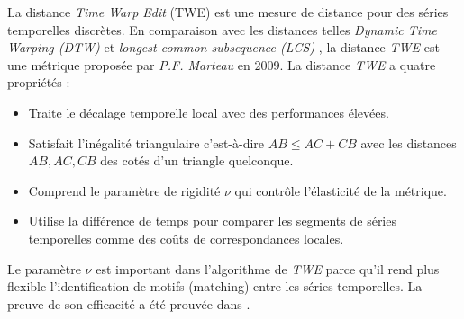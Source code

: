 La distance {\em Time Warp Edit} (TWE) est une mesure de distance pour des s\'eries temporelles  discr\`etes. En comparaison avec les distances telles {\em Dynamic Time Warping (DTW)} \cite{muller2007dynamicDTW} et {\em longest common subsequence (LCS)} \cite{greenberg2002fastLCS}, la distance {\em TWE} est une m\'etrique propos\'ee par {\em P.F. Marteau} en $2009$. 
La distance {\em TWE} a quatre propri\'et\'es :
\begin{itemize}
	\item Traite le d\'ecalage temporelle local avec des performances \'elev\'ees.
	\item Satisfait l'in\'egalit\'e triangulaire c'est-\`a-dire $AB \le AC+CB$ avec les distances$AB,AC, CB$ des cot\'es d'un triangle quelconque.
	\item Comprend le param\`etre de rigidit\'e $\nu$ qui contr\^ole l'\'elasticit\'e de la m\'etrique.
	\item Utilise la diff\'erence de temps pour comparer les segments de s\'eries temporelles comme des co\^uts de correspondances locales. 
\end{itemize}
Le param\`etre $\nu$ est important dans l'algorithme de {\em TWE} parce qu'il rend plus flexible l'identification de motifs (matching) entre les s\'eries temporelles. 
La preuve de son efficacit\'e a \'et\'e prouv\'ee dans \cite{marteau2009time}.

